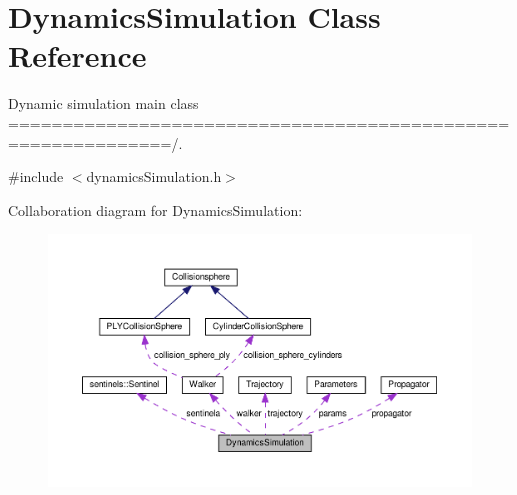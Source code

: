 \hypertarget{class_dynamics_simulation}{}\section{Dynamics\+Simulation Class Reference}
\label{class_dynamics_simulation}


Dynamic simulation main class =============================================================/.  




{\ttfamily \#include $<$dynamics\+Simulation.\+h$>$}



Collaboration diagram for Dynamics\+Simulation\+:\nopagebreak
\begin{figure}[H]
\begin{center}
\leavevmode
\includegraphics[width=350pt]{class_dynamics_simulation__coll__graph}
\end{center}
\end{figure}
